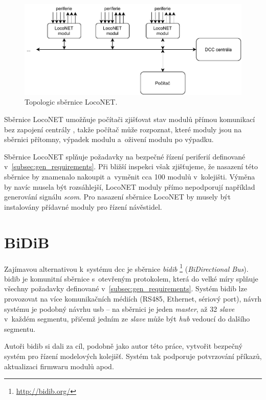 \begin{figure}[ht!]
\includegraphics[width=\textwidth]{data/loconet.pdf}
\caption{Topologic sběrnice LocoNET.}
\label{fig:loconet-topology}
\end{figure}

Sběrnice LocoNET umožňuje počítači zjišťovat stav modulů přímou komunikací bez
zapojení centrály \cite{loconet-specs}, takže počítač může rozpoznat, které
moduly jsou na sběrnici přítomny, výpadek modulu a~oživení modulu po výpadku.

Sběrnice LocoNET splňuje požadavky na bezpečné řízení periferií
definované v~\ref{subsec:gen_requirements}. Při bližší inspekci však
zjišťujeme, že nasazení této sběrnice by znamenalo nakoupit a~vyměnit cca 100
modulů v~kolejišti. Výměna by navíc musela být rozsáhlejší, LocoNET
moduly přímo nepodporují například generování signálu \textit{\gls{scom}}. Pro
nasazení sběrnice LocoNET by musely být instalovány přídavné moduly
pro řízení návěstidel.

\section{BiDiB}

Zajímavou alternativou k~systému \gls{dcc} je sběrnice \textit{\gls{bidib}}
\footnote{\url{http://bidib.org/}} (\textit{BiDirectional Bus}). \gls{bidib}
je komunitní sběrnice s~otevřeným protokolem, která do velké míry splňuje
všechny požadavky definované v~\ref{subsec:gen_requirements}. Systém \gls{bidib}
lze provozovat na více komunikačních médiích (RS485, Ethernet, sériový port),
návrh systému je podobný návrhu \gls{usb} – na sběrnici je jeden \textit{master},
až 32 \textit{slave} v~každém segmentu, přičemž jedním ze \textit{slave} může
být \textit{hub} vedoucí do dalšího segmentu.

Autoři \gls{bidib} si dali za cíl, podobně jako autor této práce, vytvořit
bezpečný systém pro řízení modelových kolejišť. Systém tak podporuje potvrzování
příkazů, aktualizaci firmwaru modulů apod.


